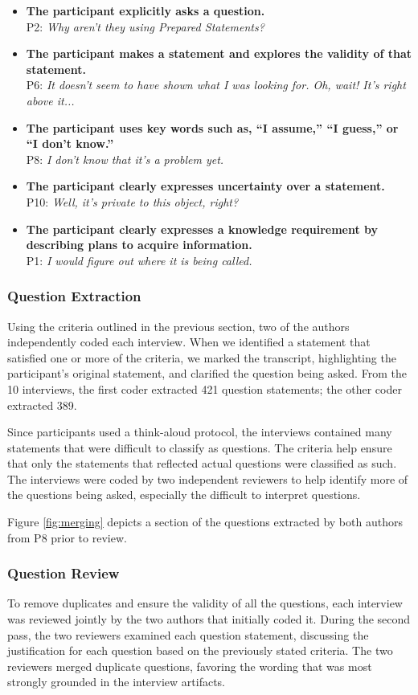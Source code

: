 \documentclass[conference]{IEEEtran}
\begin{document}
\begin{itemize}
\item \textbf{The participant explicitly asks a question.}
\\ P2: \textit{Why aren't they using Prepared Statements?}
\item \textbf{The participant makes a statement and explores the validity of that statement.}
\\ P6: \textit{It doesn't seem to have shown what I was looking for. Oh, wait! It's right above it...}
\item \textbf{The participant uses key words such as, ``I assume,'' ``I guess,'' or ``I don't know.''}
\\ P8: \textit{I don't know that it's a problem yet.}
\item \textbf{The participant clearly expresses uncertainty over a statement.}
\\ P10: \textit{Well, it's private to this object, right?}
\item \textbf{The participant clearly expresses a knowledge requirement by describing plans to acquire information.}
\\ P1: \textit{I would figure out where it is being called.}

\end{itemize}

\subsubsection{Question Extraction}
Using the criteria outlined in the previous section, two of the authors independently coded each interview. 
When we identified a statement that satisfied one or more of the criteria, we marked the transcript, highlighting the participant's original statement, and clarified the question being asked.
From the 10 interviews, the first coder extracted 421 question statements; the other coder extracted 389. 

Since participants used a think-aloud protocol, the interviews contained many statements that were difficult to classify as questions. 
The criteria help ensure that only the statements that reflected actual questions were classified as such. 
The interviews were coded by two independent reviewers to help identify more of the questions being asked, especially the difficult to interpret questions.

Figure \ref{fig:merging} depicts a section of the questions extracted by both authors from P8 prior to review.
\subsubsection{Question Review}
To remove duplicates and ensure the validity of all the questions, each interview was reviewed jointly by the two authors that initially coded it.
During the second pass, the two reviewers examined each question statement, discussing the justification for each question based on the previously stated criteria.
The two reviewers merged duplicate questions, favoring the wording that was most strongly grounded in the interview artifacts.
\end{document}
